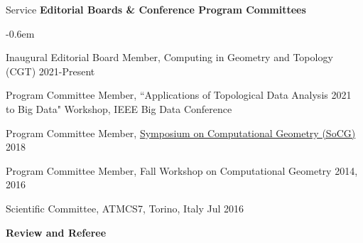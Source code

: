 \documentclass{resume} %
\begin{document}
\begin{rSection}{Service}
\textbf{Editorial Boards \& Conference Program Committees}

\begin{list}{}{\leftmargin=1em}
   \itemsep -0.6em \vspace{-0.5em} %
   \item Inaugural Editorial Board Member, Computing in Geometry and Topology (CGT)  \hfill 2021-Present
\item
Program Committee Member, ``Applications of Topological Data Analysis \hfill 2021\\
\phantom{MMM}to Big Data" Workshop, IEEE Big Data Conference
\item
Program Committee Member, \href{https://www.renyi.hu/conferences/socg18/}{Symposium on Computational Geometry (SoCG)} \hfill 2018
\item {Program Committee Member, Fall Workshop on Computational Geometry} \hfill 2014, 2016
\item
{Scientific Committee,
ATMCS7, Torino, Italy} \hfill Jul 2016\\
 \phantom{MMM}{Applied Topology: Methods, Computation, and Science}
\end{list}




\textbf{Review and Referee}


\end{rSection}
\end{document}
